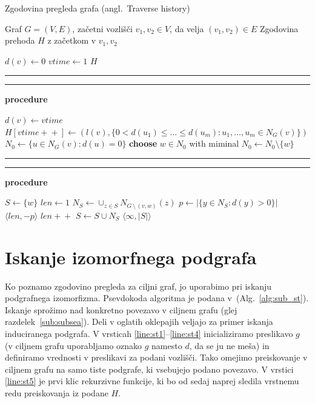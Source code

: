 \documentclass[a4paper, 12pt, ]{book}
\newcommand\Subalg[1]{%
	\Statex%
	\vspace*{-.7\baselineskip}%
	\hspace*{\dimexpr-\algorithmicindent-4pt\relax}%
	\rule{\textwidth}{0.4pt}%
	\Statex%
	
	\vspace*{-.7\baselineskip}%
	\Statex\hspace*{\dimexpr-\algorithmicindent-2pt\relax}%
	\rule{\textwidth}{0.4pt}%
	
	\Statex\hspace*{-\algorithmicindent}\textbf{procedure} #1%
}
\newcommand{\refalg}[1]{(Alg.~\ref{#1})}
\begin{document}
\begin{algorithm}
\caption{Zgodovina pregleda grafa (angl.~Traverse history)}
\label{alg:sub_th}
\begin{algorithmic}[1]
	\Require Graf $G = (V, E)$, začetni vozlišči $v_1, v_2 \in V$, da velja $(v_1, v_2) \in E$
	\Ensure Zgodovina prehoda $H$ z začetkom v $v_1, v_2$

				\label{line:th1}
		\State $d(v) \gets 0$
	\EndFor
	\State $vtime \gets 1$
	\State {}		\label{line:th4}
	\State \Return $H$


	\Subalg{}
	\State $d(v) \gets vtime$ 		\label{line:th6}
	\State $H[vtime+\!+] \gets (l(v), \{0 < d(u_1) \leq \ldots \leq d(u_m) : u_1, \ldots, u_m \in N_G(v)\})$ 	\label{line:th7}
								\label{line:th8}
	\EndIf
	\State $N_0 \gets \{ u \in N_G(v): d(u) = 0 \}$		\label{line:th9}
						\label{line:th10}
		\State \textbf{choose} $w \in N_0$ with miminal 		\label{line:th11}
								\label{line:th12}
		\EndIf
		\State $N_0 \gets N_0 \setminus \{w\}$		\label{line:th13}
	\EndWhile


	\Subalg{}
	\State $S \gets \{w\}$						\label{line:th14}
	\State $len \gets 1$							\label{line:th15}
	\Repeat
		\State $N_S \gets \cup_{z \in S}N_{G\, \setminus\,  (v,w)}(z)$	\label{line:th17}
		\State $p \gets | \{ y \in N_S: d(y) > 0 \} |$					\label{line:th18}
												\label{line:th19}
			\Return $\langle len, -p \rangle$
		\EndIf
		\State $len+\!+$						\label{line:th20}
		\State $S \gets S \cup N_S$			\label{line:th21}
					\label{line:th22}
	\State \Return $ \langle \infty, |S| \rangle $	\label{line:th23}
\end{algorithmic}
\end{algorithm}

	\clearpage


	\section{Iskanje izomorfnega podgrafa}
	\label{sub:search}
	Ko poznamo zgodovino pregleda za ciljni graf, jo uporabimo pri iskanju podgrafnega izomorfizma. Psevdokoda algoritma je podana v~\refalg{alg:sub_st}.
	Iskanje sprožimo nad konkretno povezavo v ciljnem grafu (glej razdelek~\ref{sub:subsea}). Deli v oglatih oklepajih veljajo za primer iskanja
	induciranega podgrafa. V vrsticah \ref{line:st1}--\ref{line:st4} inicializiramo preslikavo $g$ (v ciljnem grafu uporabljamo oznako $g$ namesto $d$,
	da se ju ne meša) in definiramo vrednosti v preslikavi za podani vozlišči. Tako omejimo preiskovanje v ciljnem grafu na samo tiste podgrafe, ki 
	vsebujejo podano povezavo. V vrstici \ref{line:st5} je prvi klic rekurzivne funkcije, ki bo od sedaj naprej sledila vrstnemu redu preiskovanja iz podane
	$H$.
	
\end{document}

